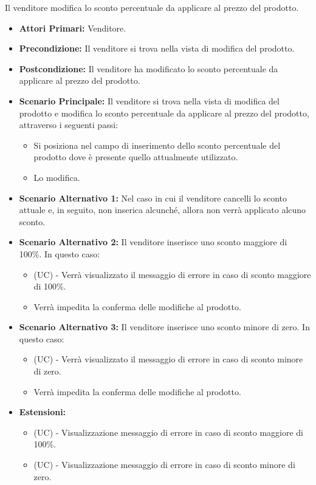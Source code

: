Il venditore modifica lo sconto percentuale da applicare al prezzo del prodotto.
\begin{itemize}
    \item \textbf{Attori Primari:} Venditore.
    \item \textbf{Precondizione:} Il venditore si trova nella vista di modifica del prodotto.
    \item \textbf{Postcondizione:} Il venditore ha modificato lo sconto percentuale da applicare al prezzo del prodotto.
    \item \textbf{Scenario Principale:} Il venditore si trova nella vista di modifica del prodotto e modifica lo sconto percentuale da applicare al prezzo del prodotto, attraverso i seguenti passi:
    \begin{itemize}
        \item Si posiziona nel campo di inserimento dello sconto percentuale del prodotto dove è presente quello attualmente utilizzato.
        \item Lo modifica.
    \end{itemize}
    \item \textbf{Scenario Alternativo 1:} Nel caso in cui il venditore cancelli lo sconto attuale e, in seguito, non inserica alcunché, allora non verrà applicato alcuno sconto.
    \item \textbf{Scenario Alternativo 2:} Il venditore inserisce uno sconto maggiore di 100\%. In questo caso:
    \begin{itemize}
        \item (UC) - Verrà visualizzato il messaggio di errore in caso di sconto maggiore di 100\%.
        \item Verrà impedita la conferma delle modifiche al prodotto.
    \end{itemize}
    \item \textbf{Scenario Alternativo 3:} Il venditore inserisce uno sconto minore di zero. In questo caso:
    \begin{itemize}
        \item (UC) - Verrà visualizzato il messaggio di errore in caso di sconto minore di zero.
        \item Verrà impedita la conferma delle modifiche al prodotto.
    \end{itemize}
    \item \textbf{Estensioni:}
        \begin{itemize}
            \item (UC) - Visualizzazione messaggio di errore in caso di sconto maggiore di 100\%.
            \item (UC) - Visualizzazione messaggio di errore in caso di sconto minore di zero.
        \end{itemize}
\end{itemize}

